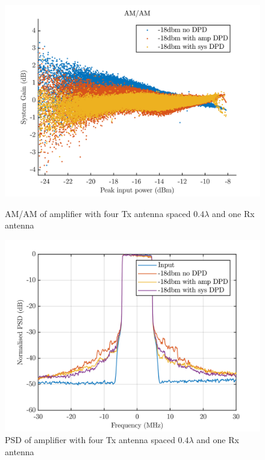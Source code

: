 \begin{figure}[H]
  \centering
  \begin{minipage}[b]{0.5\textwidth}
	\includegraphics[scale = 0.5]{figures/measurement/cree/four/amam_four_ant_0p4.png}
	\caption{AM/AM of amplifier with four Tx antenna spaced $0.4\lambda$ and one Rx antenna}
    \label{fig:cree_amam_four_ant3}
  \end{minipage}
  \hfill
  \begin{minipage}[b]{0.4\textwidth}
\includegraphics[scale = 0.5]{figures/measurement/cree/four/psd_four_ant_0p4.png}
\caption{PSD of amplifier with four Tx antenna spaced $0.4\lambda$ and one Rx antenna}
    \label{fig:cree_psd_four_ant3}
  \end{minipage}
\end{figure}

